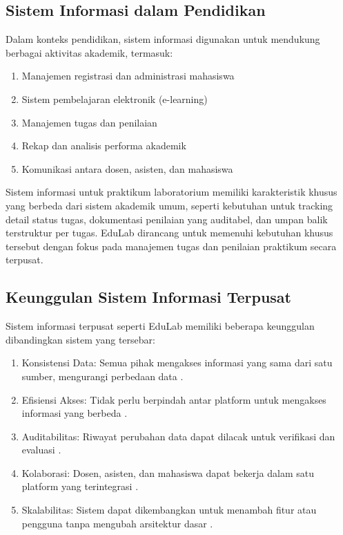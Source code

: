 \documentclass[12pt,a4paper,twoside]{report}
\begin{document}
\subsection{Sistem Informasi dalam Pendidikan}

Dalam konteks pendidikan, sistem informasi digunakan untuk mendukung berbagai aktivitas akademik, termasuk:

\begin{enumerate}
    \item Manajemen registrasi dan administrasi mahasiswa \cite{bourgeois2014}
    \item Sistem pembelajaran elektronik (e-learning) \cite{alfraihat2020}
    \item Manajemen tugas dan penilaian \cite{bourgeois2014}
    \item Rekap dan analisis performa akademik \cite{bourgeois2014}
    \item Komunikasi antara dosen, asisten, dan mahasiswa \cite{adekunle2024}
\end{enumerate}

Sistem informasi untuk praktikum laboratorium memiliki karakteristik khusus yang berbeda dari sistem akademik umum, seperti kebutuhan untuk tracking detail status tugas, dokumentasi penilaian yang auditabel, dan umpan balik terstruktur per tugas. EduLab dirancang untuk memenuhi kebutuhan khusus tersebut dengan fokus pada manajemen tugas dan penilaian praktikum secara terpusat.

\subsection{Keunggulan Sistem Informasi Terpusat}

Sistem informasi terpusat seperti EduLab memiliki beberapa keunggulan dibandingkan sistem yang tersebar:

\begin{enumerate}
    \item Konsistensi Data: Semua pihak mengakses informasi yang sama dari satu sumber, mengurangi perbedaan data \cite{stair2018}.
    \item Efisiensi Akses: Tidak perlu berpindah antar platform untuk mengakses informasi yang berbeda \cite{stair2018}.
    \item Auditabilitas: Riwayat perubahan data dapat dilacak untuk verifikasi dan evaluasi \cite{laudon2016}.
    \item Kolaborasi: Dosen, asisten, dan mahasiswa dapat bekerja dalam satu platform yang terintegrasi \cite{stair2018}.
    \item Skalabilitas: Sistem dapat dikembangkan untuk menambah fitur atau pengguna tanpa mengubah arsitektur dasar \cite{laudon2016}.
\end{enumerate}
\end{document}
